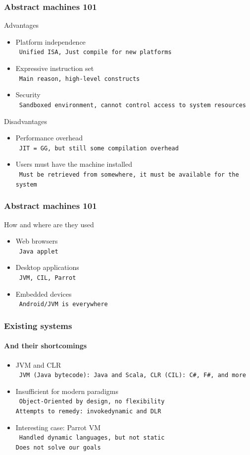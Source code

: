 \documentclass{beamer}
\newcommand{\n}[1]{\leavevmode\\~\texttt{\color{red}\tiny #1}}
\begin{document}
\begin{frame}
  \frametitle{Abstract machines 101}

  Advantages
  \begin{itemize}[<+->]
  \item Platform independence
    \n{Unified ISA, Just compile for new platforms}
  \item Expressive instruction set
    \n{Main reason, high-level constructs}
  \item Security
    \n{Sandboxed environment, cannot control access to system resources}
  \end{itemize}


  Disadvantages
  \begin{itemize}[<+->]
  \item Performance overhead
    \n{JIT = GG, but still some compilation overhead}
  \item Users must have the machine installed
    \n{Must be retrieved from somewhere, it must be available for the system}
  \end{itemize}

\end{frame}

\begin{frame}
  \frametitle{Abstract machines 101}

  How and where are they used
  \begin{itemize}[<+->]
  \item Web browsers
    \n{Java applet}
  \item Desktop applications
    \n{JVM, CIL, Parrot}
  \item Embedded devices
    \n{Android/JVM is everywhere}
  \end{itemize}

\end{frame}

\begin{frame}
  \frametitle{Existing systems}
  \framesubtitle{And their shortcomings}

  \begin{itemize}
  \item JVM and CLR
    \n{JVM (Java bytecode): Java and Scala, CLR (CIL): C\#, F\#, and more}
  \item Insufficient for modern paradigms
    \n{Object-Oriented by design, no flexibility\\
       Attempts to remedy: {\tt invokedynamic} and DLR
    }
  \item Interesting case: Parrot VM
    \n{Handled dynamic languages, but not static\\
       Does not solve our goals
     }
  \end{itemize}
\end{frame}
\end{document}
